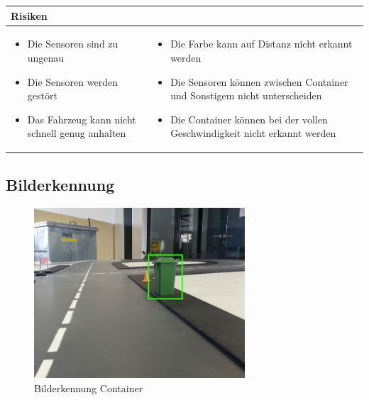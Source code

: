 \begin{table}[h]
\begin{tabular}{p{}p{}}


 \textbf{Risiken} & \\ \hline
	 
\begin{itemize}
\item Die Sensoren sind zu ungenau
\item Die Sensoren werden gestört
\item Das Fahrzeug kann nicht schnell genug anhalten
\end{itemize}
&
\begin{itemize}
\item Die Farbe kann auf Distanz nicht erkannt werden
\item Die Sensoren können zwischen Container und Sonstigem nicht unterscheiden
\item Die Container können bei der vollen Geschwindigkeit nicht erkannt werden
\end{itemize}

 
\end{tabular}
\end{table}

\pagebreak


\subsection{Bilderkennung}
\begin{figure}[h!]%
\centering
\includegraphics[width=0.7\textwidth]{fig/containererkennung_grob_bilderkennung.png}
\caption{Bilderkennung Container}
\label{fig:Bilderkennung Container}
\end{figure}

